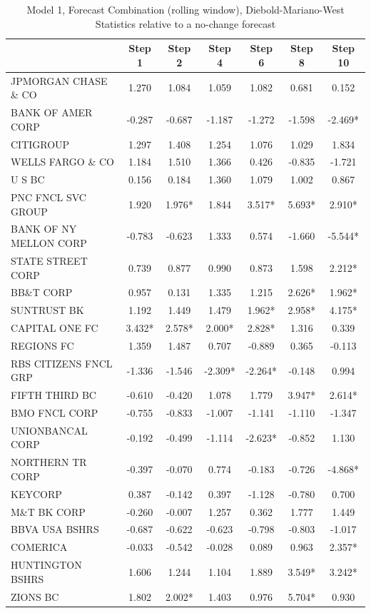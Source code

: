 \documentclass[11pt]{article}
\begin{document}
\begin{table} 
\caption{Model 1, Forecast Combination (rolling window), Diebold-Mariano-West Statistics relative to a no-change forecast}                                                     
\center                                                            
\begin{tabular}{|l|c|c|c|c|c|c|}                                   
\hline                                                             
&Step 1 &Step 2 &Step 4 &Step 6 &Step 8 &Step 10\\                 
\hline                                                             
JPMORGAN CHASE \& CO  &1.270&1.084&1.059&1.082&0.681&0.152\\       
BANK OF AMER CORP     &-0.287&-0.687&-1.187&-1.272&-1.598&-2.469*\\
CITIGROUP             &1.297&1.408&1.254&1.076&1.029&1.834\\       
WELLS FARGO \& CO     &1.184&1.510&1.366&0.426&-0.835&-1.721\\     
U S BC                &0.156&0.184&1.360&1.079&1.002&0.867\\       
PNC FNCL SVC GROUP    &1.920&1.976*&1.844&3.517*&5.693*&2.910*\\   
BANK OF NY MELLON CORP&-0.783&-0.623&1.333&0.574&-1.660&-5.544*\\  
STATE STREET CORP     &0.739&0.877&0.990&0.873&1.598&2.212*\\      
BB\&T CORP            &0.957&0.131&1.335&1.215&2.626*&1.962*\\     
SUNTRUST BK           &1.192&1.449&1.479&1.962*&2.958*&4.175*\\    
CAPITAL ONE FC        &3.432*&2.578*&2.000*&2.828*&1.316&0.339\\   
REGIONS FC            &1.359&1.487&0.707&-0.889&0.365&-0.113\\     
RBS CITIZENS FNCL GRP &-1.336&-1.546&-2.309*&-2.264*&-0.148&0.994\\
FIFTH THIRD BC        &-0.610&-0.420&1.078&1.779&3.947*&2.614*\\   
BMO FNCL CORP         &-0.755&-0.833&-1.007&-1.141&-1.110&-1.347\\ 
UNIONBANCAL CORP      &-0.192&-0.499&-1.114&-2.623*&-0.852&1.130\\ 
NORTHERN TR CORP      &-0.397&-0.070&0.774&-0.183&-0.726&-4.868*\\ 
KEYCORP               &0.387&-0.142&0.397&-1.128&-0.780&0.700\\    
M\&T BK CORP          &-0.260&-0.007&1.257&0.362&1.777&1.449\\     
BBVA USA BSHRS        &-0.687&-0.622&-0.623&-0.798&-0.803&-1.017\\ 
COMERICA              &-0.033&-0.542&-0.028&0.089&0.963&2.357*\\   
HUNTINGTON BSHRS      &1.606&1.244&1.104&1.889&3.549*&3.242*\\     
ZIONS BC              &1.802&2.002*&1.403&0.976&5.704*&0.930\\     
\hline                                                             
\end{tabular} 


\end{table}
\end{document}
